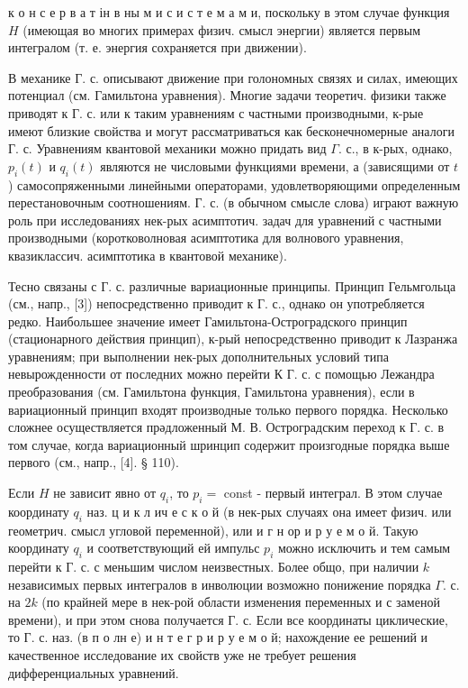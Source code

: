 \documentclass[10pt]{article}
\begin{document}
к о н с е р в а т ін в ны м и с и с т е м а м и, поскольку в этом случае функция $H$ (имеющая во многих примерах физич. смысл энергии) является первым интегралом (т. е. энергия сохраняется при движении).



В механике Г. с. описывают движение при голономных связях и силах, имеющих потенциал (см. Гамильтона уравнения). Многие задачи теоретич. физики также приводят к Г. с. или к таким уравнениям с частными производными, к-рые имеют близкие свойства и могут рассматриваться как бесконечномерные аналоги Г. с. Уравнениям квантовой механики можно придать вид $\Gamma$. с., в к-рых, однако, $p_{i}(t)$ и $q_{i}(t)$ являются не числовыми функциями времени, а (зависящими от $t$ ) самосопряженными линейными операторами, удовлетворяющими определенным перестановочным соотношениям. Г. с. (в обычном смысле слова) играют важную роль при исследованиях нек-рых асимптотич. задач для уравнений с частными производными (коротковолновая асимптотика для волнового уравнения, квазиклассич. асимптотика в квантовой механике).



Тесно связаны с Г. с. различные вариационные принципы. Принцип Гельмгольца (см., напр., [3]) непосредственно приводит к $Г$. с., однако он употребляется редко. Наибольшее значение имеет Гамильтона-Остроградского принцип (стационарного действия принцип), к-рый непосредственно приводит к Лазранжа уравнениям; при выполнении нек-рых дополнительных условий типа невырожденности от последних можно перейти К Г. с. с помощью Лежандра преобразования (см. Гамильтона функция, Гамильтона уравнения), если в вариационный принцип входят производные только первого порядка. Несколько сложнее осуществляется прәдложенный М. В. Остроградским переход к Г. с. в том случае, когда вариационный шринцип содержит произгодные порядка выше первого (см., напр., [4]. § 110).



Если $H$ не зависит явно от $q_{i}$, то $p_{i}=$ const - первый интеграл. В этом случае координату $q_{i}$ наз. ц и к л ич е с к о й (в нек-рых случаях она имеет физич. или геометрич. смысл угловой переменной), или и г н ор и р у е м о й. Такую координату $q_{i}$ и соответствующий ей импульс $p_{i}$ можно исключить и тем самым перейти к Г. с. с меньшим числом неизвестных. Более общо, при наличии $k$ независимых первых интегралов в инволюции возможно понижение порядка $\Gamma$. с. на $2 k$ (по крайней мере в нек-рой области изменения переменных и с заменой времени), и при этом снова получается Г. с. Если все координаты циклические, то Г. с. наз. (в п о лн е) и н т е г р и р у е м о й; нахождение ее решений и качественное исследование их свойств уже не требует решения дифференциальных уравнений.
\end{document}
